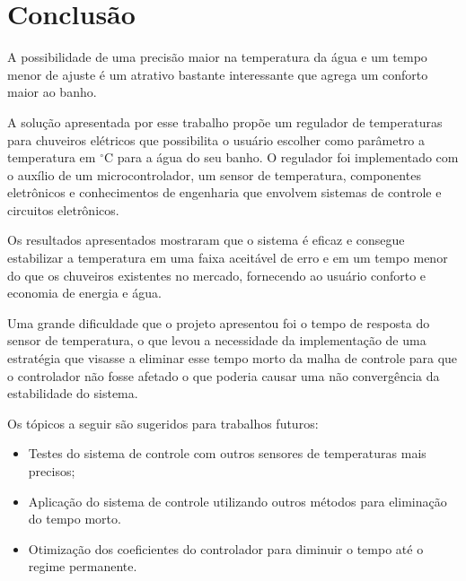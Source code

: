 \chapter{Conclusão}

A possibilidade de uma precisão maior na temperatura  da água e um tempo menor de ajuste é um atrativo bastante interessante que agrega um conforto maior ao banho.

A solução apresentada por esse trabalho propõe um regulador de temperaturas para chuveiros elétricos que possibilita o usuário escolher como parâmetro a temperatura em $^\circ$C para a água do seu banho. O regulador foi implementado com o auxílio de um microcontrolador, um sensor de temperatura, componentes eletrônicos e conhecimentos de engenharia que envolvem sistemas de controle e circuitos eletrônicos.

Os resultados apresentados mostraram que o sistema é eficaz e consegue estabilizar a temperatura em uma faixa aceitável de erro e em um tempo menor do que os chuveiros existentes no mercado, fornecendo ao usuário conforto e economia de energia e água.

Uma grande dificuldade que o projeto apresentou foi o tempo de resposta do sensor de temperatura, o que levou a necessidade da implementação de uma estratégia que visasse a eliminar esse tempo morto da malha de controle para que o controlador não fosse afetado o que poderia causar uma não convergência da estabilidade do sistema. 

Os tópicos a seguir são sugeridos para trabalhos futuros:
\begin{itemize}
\item Testes do sistema de controle com outros sensores de temperaturas mais precisos;
\item Aplicação do sistema de controle utilizando outros métodos para eliminação do tempo morto.
\item Otimização dos coeficientes do controlador para diminuir o tempo até o regime permanente.

\end{itemize}